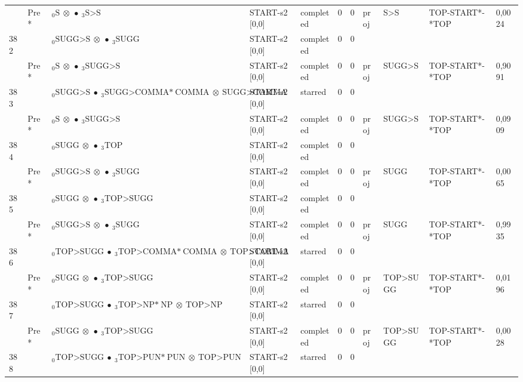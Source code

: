 \documentclass[10pt]{article}
\begin{document}
\begin{longtable}[htbp]{lllllllllll}
 & Pre *& $ {}_0 \textrm{S} \  \otimes \  \bullet \ {}_{3} \textrm{S>S} $ & START-s2 [0,0] & completed & 0 & 0 & proj & S>S & TOP-START*-*TOP & 0,0024 \\ 
382 & & $ {}_0 \textrm{SUGG>S} \  \otimes \  \bullet \ {}_{3} \textrm{SUGG} $ & START-s2 [0,0] & completed & 0 & 0 & & & & \\ 
 & Pre *& $ {}_0 \textrm{S} \  \otimes \  \bullet \ {}_{3} \textrm{SUGG>S} $ & START-s2 [0,0] & completed & 0 & 0 & proj & SUGG>S & TOP-START*-*TOP & 0,9091 \\ 
383 & & $ {}_0 \textrm{SUGG>S} \  \bullet \ {}_{3} \textrm{SUGG>COMMA*} \ \textrm{COMMA} \  \otimes \ \textrm{SUGG>COMMA} $ & START-s2 [0,0] & starred & 0 & 0 & & & & \\ 
 & Pre *& $ {}_0 \textrm{S} \  \otimes \  \bullet \ {}_{3} \textrm{SUGG>S} $ & START-s2 [0,0] & completed & 0 & 0 & proj & SUGG>S & TOP-START*-*TOP & 0,0909 \\ 
384 & & $ {}_0 \textrm{SUGG} \  \otimes \  \bullet \ {}_{3} \textrm{TOP} $ & START-s2 [0,0] & completed & 0 & 0 & & & & \\ 
 & Pre *& $ {}_0 \textrm{SUGG>S} \  \otimes \  \bullet \ {}_{3} \textrm{SUGG} $ & START-s2 [0,0] & completed & 0 & 0 & proj & SUGG & TOP-START*-*TOP & 0,0065 \\ 
385 & & $ {}_0 \textrm{SUGG} \  \otimes \  \bullet \ {}_{3} \textrm{TOP>SUGG} $ & START-s2 [0,0] & completed & 0 & 0 & & & & \\ 
 & Pre *& $ {}_0 \textrm{SUGG>S} \  \otimes \  \bullet \ {}_{3} \textrm{SUGG} $ & START-s2 [0,0] & completed & 0 & 0 & proj & SUGG & TOP-START*-*TOP & 0,9935 \\ 
386 & & $ {}_0 \textrm{TOP>SUGG} \  \bullet \ {}_{3} \textrm{TOP>COMMA*} \ \textrm{COMMA} \  \otimes \ \textrm{TOP>COMMA} $ & START-s2 [0,0] & starred & 0 & 0 & & & & \\ 
 & Pre *& $ {}_0 \textrm{SUGG} \  \otimes \  \bullet \ {}_{3} \textrm{TOP>SUGG} $ & START-s2 [0,0] & completed & 0 & 0 & proj & TOP>SUGG & TOP-START*-*TOP & 0,0196 \\ 
387 & & $ {}_0 \textrm{TOP>SUGG} \  \bullet \ {}_{3} \textrm{TOP>NP*} \ \textrm{NP} \  \otimes \ \textrm{TOP>NP} $ & START-s2 [0,0] & starred & 0 & 0 & & & & \\ 
 & Pre *& $ {}_0 \textrm{SUGG} \  \otimes \  \bullet \ {}_{3} \textrm{TOP>SUGG} $ & START-s2 [0,0] & completed & 0 & 0 & proj & TOP>SUGG & TOP-START*-*TOP & 0,0028 \\ 
388 & & $ {}_0 \textrm{TOP>SUGG} \  \bullet \ {}_{3} \textrm{TOP>PUN*} \ \textrm{PUN} \  \otimes \ \textrm{TOP>PUN} $ & START-s2 [0,0] & starred & 0 & 0 & & & & \\ 

\end{longtable}
\end{document}

